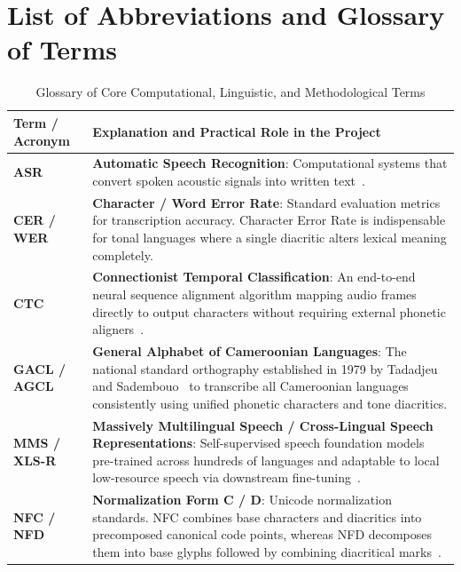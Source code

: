 \documentclass[a4paper,11pt]{article}
\author{1\textsuperscript{st} Wriwiya Abba, 2\textsuperscript{nd} Robine Donfack, 3\textsuperscript{rd} Natacha Djiofack, 4\textsuperscript{th} Thomas Nguisseu,\\5\textsuperscript{th} Abraham Noumsi, 6\textsuperscript{th} Manuel Yombo, 7\textsuperscript{th} Thierry Tene\\[0.5ex]
\normalsize Saint Jean Ingenieur\\
\normalsize Eyang, Cameroon\\[0.5ex]
\normalsize\texttt{\{abba.wriwiya, donfack.robine, maurelle.djiofack, nguisseu.thomas, simo.abraham, tagne.manuel, tsafack.thierry\}@saintjeaningenieur.org}}
\begin{document}
\mytitle

\newpage

\frontmatter

\tableofcontents

\newpage

\section*{List of Abbreviations and Glossary of Terms}

\begin{table}[h!]
\centering
\small
\caption{Glossary of Core Computational, Linguistic, and Methodological Terms}
\label{tab:glossary_chap3}
\begin{tabular}{>{\raggedright\arraybackslash}p{3.2cm} >{\raggedright\arraybackslash}p{14.3cm}}
\toprule
\textbf{Term / Acronym} & \textbf{Explanation and Practical Role in the Project} \\
\midrule
\textbf{ASR} & \textbf{Automatic Speech Recognition}: Computational systems that convert spoken acoustic signals into written text~\cite{graves2006connectionist, radford2023robust}. \\
\addlinespace
\textbf{CER / WER} & \textbf{Character / Word Error Rate}: Standard evaluation metrics for transcription accuracy. Character Error Rate is indispensable for tonal languages where a single diacritic alters lexical meaning completely. \\
\addlinespace
\textbf{CTC} & \textbf{Connectionist Temporal Classification}: An end-to-end neural sequence alignment algorithm mapping audio frames directly to output characters without requiring external phonetic aligners~\cite{graves2006connectionist}. \\
\addlinespace
\textbf{GACL / AGCL} & \textbf{General Alphabet of Cameroonian Languages}: The national standard orthography established in 1979 by Tadadjeu and Sadembouo~\cite{tadadjeu1979alphabet} to transcribe all Cameroonian languages consistently using unified phonetic characters and tone diacritics. \\
\addlinespace
\textbf{MMS / XLS-R} & \textbf{Massively Multilingual Speech / Cross-Lingual Speech Representations}: Self-supervised speech foundation models pre-trained across hundreds of languages and adaptable to local low-resource speech via downstream fine-tuning~\cite{conneau2023fleurs}. \\
\addlinespace
\textbf{NFC / NFD} & \textbf{Normalization Form C / D}: Unicode normalization standards. NFC combines base characters and diacritics into precomposed canonical code points, whereas NFD decomposes them into base glyphs followed by combining diacritical marks~\cite{unicode2024standard}. \\

\end{tabular}
\end{table}
\end{document}

